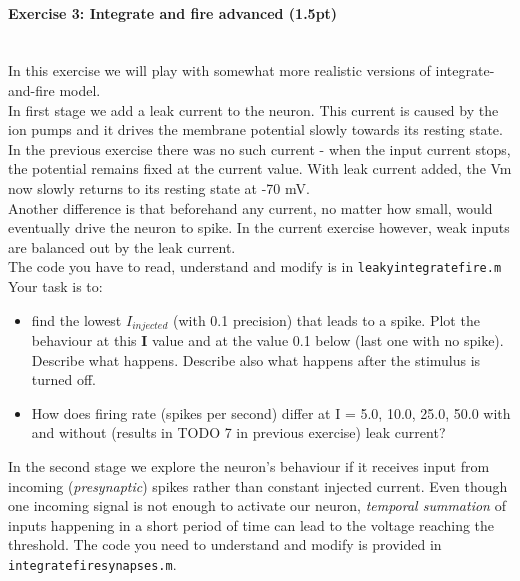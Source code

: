 \documentclass[a4paper,11pt]{article}
\newenvironment{exercise}[3]{\paragraph{Exercise #1: #2 (#3pt)}\ \\}{
\medskip}
\begin{document}
%
\begin{exercise}{3}{Integrate and fire advanced}{1.5}

In this exercise we will play with somewhat more realistic versions of integrate-and-fire model.\\

In first stage we add a leak current to the neuron. This current is caused by the ion pumps and it drives the membrane potential slowly towards its resting state. In the previous exercise there was no such current - when the input current stops, the potential remains fixed at the current value. With leak current added, the Vm now slowly returns to its resting state at -70 mV.\\
Another difference is that beforehand any current, no matter how small, would eventually drive the neuron to spike. In the current exercise however, weak inputs are balanced out by the leak current.\\

The code you have to read, understand and modify is in \texttt{leakyintegratefire.m}\\

Your task is to:
\begin{itemize}
\item find the lowest $I_{injected}$ (with 0.1 precision) that leads to a spike. Plot the behaviour at this \textbf{I} value and at the value 0.1 below (last one with no spike). Describe what happens. Describe also what happens after the stimulus is turned off.
\item How does firing rate (spikes per second) differ at I = 5.0, 10.0, 25.0, 50.0 with and without (results in TODO 7 in previous exercise) leak current? 
\end{itemize}

In the second stage we explore the neuron's behaviour if it receives input from incoming (\emph{presynaptic}) spikes rather than constant injected current. Even though one incoming signal is not enough to activate our neuron, \emph{temporal summation} of inputs happening in a short period of time can lead to the voltage reaching the threshold. The code you need to understand and modify is provided in \texttt{integratefiresynapses.m}.\\


\end{exercise}
\end{document}
